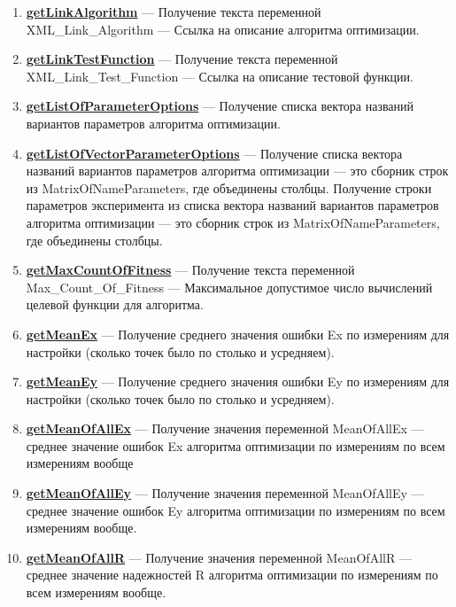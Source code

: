 \documentclass[a4paper,12pt]{article}
\begin{document}
\begin{enumerate}
\item \textbf{\hyperref[getLinkAlgorithm]{getLinkAlgorithm}} --- Получение текста переменной  XML\_Link\_Algorithm --- Ссылка на описание алгоритма оптимизации.

\item \textbf{\hyperref[getLinkTestFunction]{getLinkTestFunction}} --- Получение текста переменной  XML\_Link\_Test\_Function --- Ссылка на описание тестовой функции.

\item \textbf{\hyperref[getListOfParameterOptions]{getListOfParameterOptions}} --- Получение списка вектора названий вариантов параметров алгоритма оптимизации.

\item \textbf{\hyperref[getListOfVectorParameterOptions]{getListOfVectorParameterOptions}} --- Получение списка вектора названий вариантов параметров алгоритма оптимизации --- это сборник строк из MatrixOfNameParameters, где объединены столбцы. Получение строки параметров эксперимента из списка вектора названий вариантов параметров алгоритма оптимизации --- это сборник строк из MatrixOfNameParameters, где объединены столбцы.

\item \textbf{\hyperref[getMaxCountOfFitness]{getMaxCountOfFitness}} --- Получение текста переменной  Max\_Count\_Of\_Fitness --- Максимальное допустимое число вычислений целевой функции для алгоритма.

\item \textbf{\hyperref[getMeanEx]{getMeanEx}} --- Получение среднего значения ошибки Ex по измерениям для настройки (сколько точек было по столько и усредняем).

\item \textbf{\hyperref[getMeanEy]{getMeanEy}} --- Получение среднего значения ошибки Ey по измерениям для настройки (сколько точек было по столько и усредняем).

\item \textbf{\hyperref[getMeanOfAllEx]{getMeanOfAllEx}} --- Получение значения переменной MeanOfAllEx --- среднее значение ошибок Ex алгоритма оптимизации по измерениям по всем измерениям вообще

\item \textbf{\hyperref[getMeanOfAllEy]{getMeanOfAllEy}} --- Получение значения переменной MeanOfAllEy --- среднее значение ошибок Ey алгоритма оптимизации по измерениям по всем измерениям вообще.

\item \textbf{\hyperref[getMeanOfAllR]{getMeanOfAllR}} --- Получение значения переменной MeanOfAllR --- среднее значение надежностей R алгоритма оптимизации по измерениям по всем измерениям вообще.


\end{enumerate}
\end{document}
